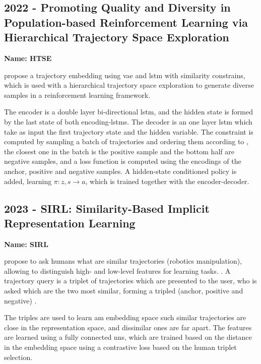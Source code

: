 \subsection*{2022 - Promoting Quality and Diversity in Population-based Reinforcement Learning via Hierarchical Trajectory Space Exploration}

\textbf{Name: HTSE}

\cite{miao2022promoting} propose a trajectory embedding using \gls{vae} and \gls{lstm} with similarity constrains, which is used with a hierarchical trajectory space exploration to generate diverse samples in a reinforcement learning framework.

The encoder is a double layer bi-directional \gls{lstm}, and the hidden state is formed by the last state of both encoding-\glspl{lstm}.
%
The decoder is an one layer \gls{lstm} which take as input the first trajectory state and the hidden variable.
%
The constraint is computed by sampling a batch of trajectories and ordering them according to , the closest one in the batch is the positive sample and the bottom half are negative samples, and a loss function is computed using the encodings of the anchor, positive and negative samples.
%
A hidden-state conditioned  policy is added, learning $\pi:z, s \rightarrow a$, which is trained together with the encoder-decoder.

\subsection*{2023 - SIRL: Similarity-Based Implicit Representation Learning}

\textbf{Name: SIRL}

\cite{bobu2023sirl} propose to ask humans what are similar trajectories (robotics manipulation), allowing to distinguish high- and low-level features for learning tasks. .
%
A trajectory query is a triplet of trajectories which are presented to the user, who is asked which are the two most similar, forming a tripled (anchor, positive and negative) .

The triples are used to learn am embedding space such similar trajectories are close in the representation space, and dissimilar ones are far apart.
%
The features are learned using a fully connected \glspl{nn}, which are trained based on the distance in the embedding space using a contrastive loss based on the human triplet selection.
